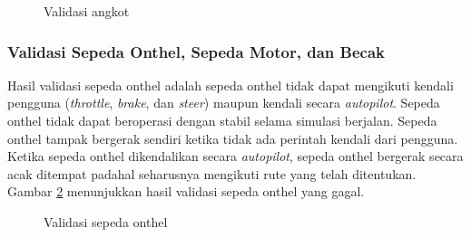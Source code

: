 \begin{figure}[!h]
    \centering
    \hfill
    \caption{Validasi angkot}
    \label{fig:angkot-validation}
\end{figure}

\subsubsection{Validasi Sepeda Onthel, Sepeda Motor, dan Becak}

Hasil validasi sepeda onthel adalah sepeda onthel tidak dapat mengikuti kendali
pengguna (\textit{throttle}, \textit{brake}, dan \textit{steer}) maupun kendali
secara \textit{autopilot}. Sepeda onthel tidak dapat beroperasi dengan stabil
selama simulasi berjalan. Sepeda onthel tampak bergerak sendiri ketika tidak ada
perintah kendali dari pengguna. Ketika sepeda onthel dikendalikan secara
\textit{autopilot}, sepeda onthel bergerak secara acak ditempat padahal
seharusnya mengikuti rute yang telah ditentukan. Gambar
\ref{fig:onthel-validation} menunjukkan hasil validasi sepeda onthel yang gagal.

\begin{figure}[!h]
    \centering
    \hfill
    \caption{Validasi sepeda onthel}
    \label{fig:onthel-validation}
\end{figure}

